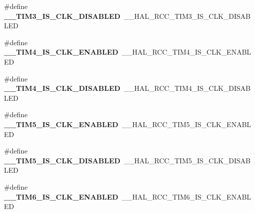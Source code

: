 \begin{DoxyCompactItemize}
\item 
\hypertarget{group___h_a_l___r_c_c___aliased_ga282a0aadb354b24a4ec554b29a4916f8}{\#define {\bfseries \-\_\-\-\_\-\-T\-I\-M3\-\_\-\-I\-S\-\_\-\-C\-L\-K\-\_\-\-D\-I\-S\-A\-B\-L\-E\-D}~\-\_\-\-\_\-\-H\-A\-L\-\_\-\-R\-C\-C\-\_\-\-T\-I\-M3\-\_\-\-I\-S\-\_\-\-C\-L\-K\-\_\-\-D\-I\-S\-A\-B\-L\-E\-D}\label{group___h_a_l___r_c_c___aliased_ga282a0aadb354b24a4ec554b29a4916f8}

\item 
\hypertarget{group___h_a_l___r_c_c___aliased_ga88c7174931d62e7126a2d5f966377894}{\#define {\bfseries \-\_\-\-\_\-\-T\-I\-M4\-\_\-\-I\-S\-\_\-\-C\-L\-K\-\_\-\-E\-N\-A\-B\-L\-E\-D}~\-\_\-\-\_\-\-H\-A\-L\-\_\-\-R\-C\-C\-\_\-\-T\-I\-M4\-\_\-\-I\-S\-\_\-\-C\-L\-K\-\_\-\-E\-N\-A\-B\-L\-E\-D}\label{group___h_a_l___r_c_c___aliased_ga88c7174931d62e7126a2d5f966377894}

\item 
\hypertarget{group___h_a_l___r_c_c___aliased_ga18e5f75acae53aeff4a5ca7108096acb}{\#define {\bfseries \-\_\-\-\_\-\-T\-I\-M4\-\_\-\-I\-S\-\_\-\-C\-L\-K\-\_\-\-D\-I\-S\-A\-B\-L\-E\-D}~\-\_\-\-\_\-\-H\-A\-L\-\_\-\-R\-C\-C\-\_\-\-T\-I\-M4\-\_\-\-I\-S\-\_\-\-C\-L\-K\-\_\-\-D\-I\-S\-A\-B\-L\-E\-D}\label{group___h_a_l___r_c_c___aliased_ga18e5f75acae53aeff4a5ca7108096acb}

\item 
\hypertarget{group___h_a_l___r_c_c___aliased_gaa8c5734b25ae1c3f802d6c0b8472209d}{\#define {\bfseries \-\_\-\-\_\-\-T\-I\-M5\-\_\-\-I\-S\-\_\-\-C\-L\-K\-\_\-\-E\-N\-A\-B\-L\-E\-D}~\-\_\-\-\_\-\-H\-A\-L\-\_\-\-R\-C\-C\-\_\-\-T\-I\-M5\-\_\-\-I\-S\-\_\-\-C\-L\-K\-\_\-\-E\-N\-A\-B\-L\-E\-D}\label{group___h_a_l___r_c_c___aliased_gaa8c5734b25ae1c3f802d6c0b8472209d}

\item 
\hypertarget{group___h_a_l___r_c_c___aliased_ga4cd9d73f820261630786460fd3aa0453}{\#define {\bfseries \-\_\-\-\_\-\-T\-I\-M5\-\_\-\-I\-S\-\_\-\-C\-L\-K\-\_\-\-D\-I\-S\-A\-B\-L\-E\-D}~\-\_\-\-\_\-\-H\-A\-L\-\_\-\-R\-C\-C\-\_\-\-T\-I\-M5\-\_\-\-I\-S\-\_\-\-C\-L\-K\-\_\-\-D\-I\-S\-A\-B\-L\-E\-D}\label{group___h_a_l___r_c_c___aliased_ga4cd9d73f820261630786460fd3aa0453}

\item 
\hypertarget{group___h_a_l___r_c_c___aliased_gab97e01d763b85c9b63bf8b76591e541b}{\#define {\bfseries \-\_\-\-\_\-\-T\-I\-M6\-\_\-\-I\-S\-\_\-\-C\-L\-K\-\_\-\-E\-N\-A\-B\-L\-E\-D}~\-\_\-\-\_\-\-H\-A\-L\-\_\-\-R\-C\-C\-\_\-\-T\-I\-M6\-\_\-\-I\-S\-\_\-\-C\-L\-K\-\_\-\-E\-N\-A\-B\-L\-E\-D}\label{group___h_a_l___r_c_c___aliased_gab97e01d763b85c9b63bf8b76591e541b}


\end{DoxyCompactItemize}
